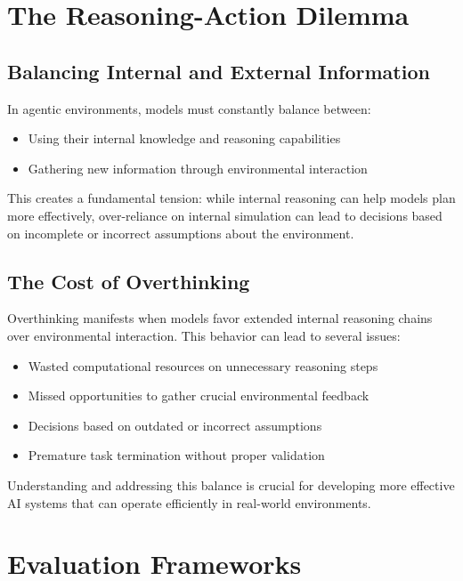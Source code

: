 \section{The Reasoning-Action Dilemma}
\label{sec:dilemma}

\subsection{Balancing Internal and External Information}
In agentic environments, models must constantly balance between:
\begin{itemize}
    \item Using their internal knowledge and reasoning capabilities
    \item Gathering new information through environmental interaction
\end{itemize}

This creates a fundamental tension: while internal reasoning can help models plan more effectively, over-reliance on internal simulation can lead to decisions based on incomplete or incorrect assumptions about the environment.

\subsection{The Cost of Overthinking}
Overthinking manifests when models favor extended internal reasoning chains over environmental interaction. This behavior can lead to several issues:
\begin{itemize}
    \item Wasted computational resources on unnecessary reasoning steps
    \item Missed opportunities to gather crucial environmental feedback
    \item Decisions based on outdated or incorrect assumptions
    \item Premature task termination without proper validation
\end{itemize}

Understanding and addressing this balance is crucial for developing more effective AI systems that can operate efficiently in real-world environments.

\section{Evaluation Frameworks}
\label{sec:frameworks}

